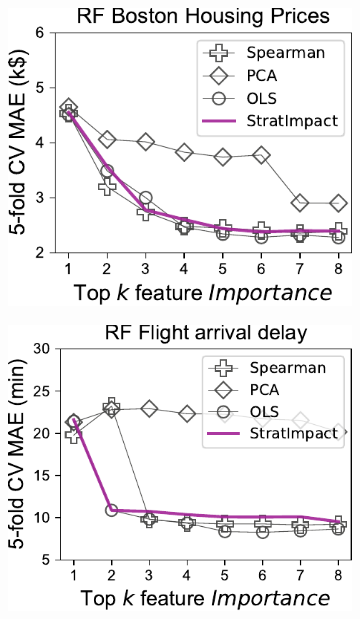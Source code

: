 \documentclass[11pt]{article}
\begin{document}
\begin{figure}
\centering
\begin{subfigure}{.245\textwidth}
    \centering
\includegraphics[scale=0.45]{images/boston-topk-baseline-Importance.pdf}
\end{subfigure}%
\begin{subfigure}{.245\textwidth}
    \centering
\includegraphics[scale=0.45]{images/flights-topk-baseline-Importance.pdf}
\end{subfigure}
\begin{subfigure}{.245\textwidth}

\end{subfigure}
\end{figure}
\end{document}
